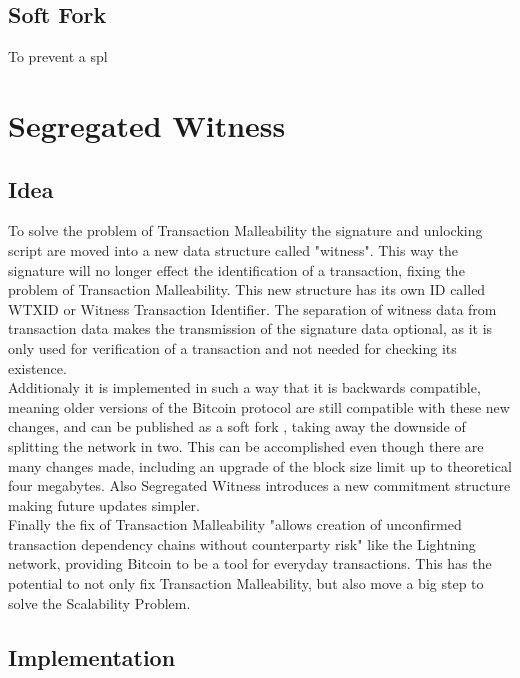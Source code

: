 \subsection{Soft Fork}
\label{sec:Basics:SoftFork}
To prevent a spl


\section{Segregated Witness}
\label{ch:SegWit}


\subsection{Idea}
\label{sec:SegWit:Idea}
To solve the problem of Transaction Malleability the signature and unlocking script are moved into a new data structure called "witness". This way the signature will no longer effect the identification of a transaction, fixing the problem of Transaction Malleability. This new structure has its own ID called WTXID or Witness Transaction Identifier. The separation of witness data from transaction data makes the transmission of the signature data optional, as it is only used for verification of a transaction and not needed for checking its existence. \\
Additionaly it is implemented in such a way that it is backwards compatible, meaning older versions of the Bitcoin protocol are still compatible with these new changes, and can be published as a soft fork , taking away the downside of splitting the network in two. This can be accomplished even though there are many changes made, including an upgrade of the block size limit up to theoretical four megabytes. Also Segregated Witness introduces a new commitment structure making future updates simpler. \\
Finally the fix of Transaction Malleability "allows creation of unconfirmed transaction dependency chains without counterparty risk"\cite{bip-141} like the Lightning network, providing Bitcoin to be a tool for everyday transactions. This has the potential to not only fix Transaction Malleability, but also move a big step to solve the Scalability Problem.


\subsection{Implementation}
\label{sec:SegWit:Implementation}






